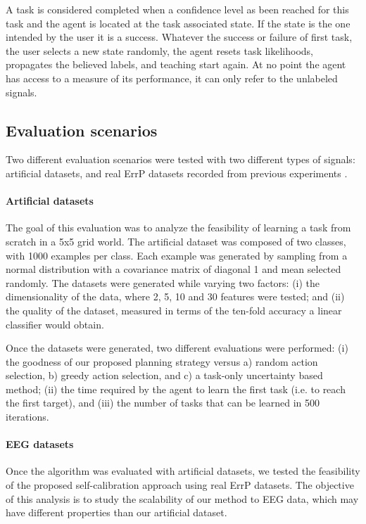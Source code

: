 A task is considered completed when a confidence level as been reached for this task and the agent is located at the task associated state. If the state is the one intended by the user it is a success. Whatever the success or failure of first task, the user selects a new state randomly, the agent resets task likelihoods, propagates the believed labels, and teaching start again. At no point the agent has access to a measure of its performance, it can only refer to the unlabeled signals.


\subsection{Evaluation scenarios}

Two different evaluation scenarios were tested with two different types of signals: artificial datasets, and real ErrP datasets recorded from previous experiments \cite{iturrate2013task}.

\paragraph{Artificial datasets}
The goal of this evaluation was to analyze the feasibility of learning a task from scratch in a 5x5 grid world. 
%
The artificial dataset was composed of two classes, with 1000 examples per class. Each example was generated by sampling from a normal distribution with a covariance matrix of diagonal 1 and mean selected randomly. The datasets were generated while varying two factors: (i) the dimensionality of the data, where 2, 5, 10 and 30 features were tested; and (ii) the quality of the dataset, measured in terms of the ten-fold accuracy a linear classifier would obtain. 

Once the datasets were generated, two different evaluations were performed: (i) the goodness of our proposed planning strategy versus a) random action selection, b) greedy action selection, and c) a task-only uncertainty based method; (ii) the time required by the agent to learn the first task (i.e. to reach the first target), and (iii) the number of tasks that can be learned in 500 iterations.

\paragraph{EEG datasets}
Once the algorithm was evaluated with artificial datasets, we tested the feasibility of the proposed self-calibration approach using real ErrP datasets. The objective of this analysis is to study the scalability of our method to EEG data, which may have different properties than our artificial dataset. 


